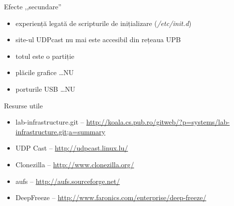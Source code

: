 \documentclass{beamer}
\begin{document}
\begin{frame}{Efecte ,,secundare''}
  \begin{itemize}
    \item experiență legată de scripturile de inițializare
      (\textit{/etc/init.d})
    \item site-ul UDPcast nu mai este accesibil din rețeaua UPB
    \item totul este o partiție
    \item plăcile grafice \ldots NU
    \item porturile USB \ldots NU
  \end{itemize}
\end{frame}

\begin{frame}{Resurse utile}
  \begin{itemize}
    \item lab-infrastructure.git --
      \url{http://koala.cs.pub.ro/gitweb/?p=systems/lab-infrastructure.git;a=summary}
    \item UDP Cast -- \url{http://udpcast.linux.lu/}
    \item Clonezilla -- \url{http://www.clonezilla.org/}
    \item aufs -- \url{http://aufs.sourceforge.net/}
    \item DeepFreeze -- \url{http://www.faronics.com/enterprise/deep-freeze/}
  \end{itemize}
\end{frame}
\end{document}
